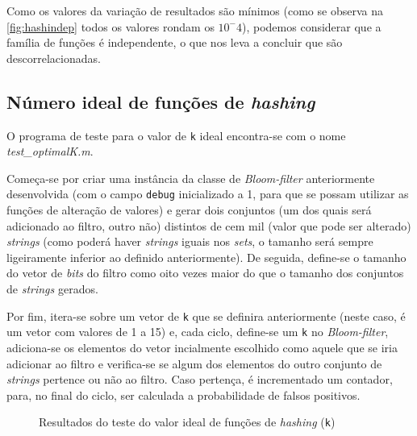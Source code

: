 \documentclass[a4paper,11pt,openright,oneside]{report}
\begin{document}
Como os valores da variação de resultados são mínimos (como se observa na \autoref{fig:hashindep} todos os valores rondam os $10^-4$), podemos considerar que a família de funções é independente, o que nos leva a concluir que são descorrelacionadas.

\subsection{Número ideal de funções de \textit{hashing}}
\label{subsec.optimalk}

O programa de teste para o valor de \texttt{k} ideal encontra-se com o nome \textit{test\_optimalK.m}.

Começa-se por criar uma instância da classe de \textit{Bloom-filter} anteriormente desenvolvida (com o campo \texttt{debug} inicializado a 1, para que se possam utilizar as funções de alteração de valores) e gerar dois conjuntos (um dos quais será adicionado ao filtro, outro não) distintos de cem mil (valor que pode ser alterado) \textit{strings} (como poderá haver \textit{strings} iguais nos \textit{sets}, o tamanho será sempre ligeiramente inferior ao definido anteriormente). De seguida, define-se o tamanho do vetor de \textit{bits} do filtro como oito vezes maior do que o tamanho dos conjuntos de \textit{strings} gerados.

Por fim, itera-se sobre um vetor de \texttt{k} que se definira anteriormente (neste caso, é um vetor com valores de 1 a 15) e, cada ciclo, define-se um \texttt{k} no \textit{Bloom-filter}, adiciona-se os elementos do vetor incialmente escolhido como aquele que se iria adicionar ao filtro e verifica-se se algum dos elementos do outro conjunto de \textit{strings} pertence ou não ao filtro. Caso pertença, é incrementado um contador, para, no final do ciclo, ser calculada a probabilidade de falsos positivos.

\begin{figure}[ht]	
\center
{}
\caption{Resultados do teste do valor ideal de funções de \textit{hashing} (\texttt{k})}
\label{fig:optimalk}
\end{figure}
\end{document}
